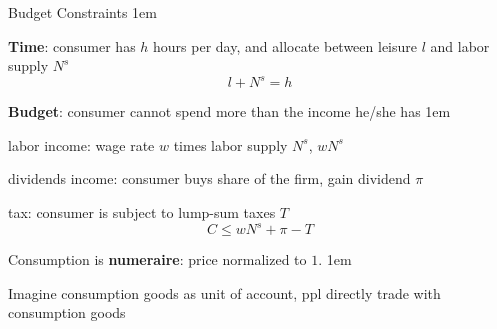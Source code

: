 \documentclass[11pt,aspectratio=43]{beamer}
\let\olditemize=\itemize
\let\endolditemize=\enditemize
\renewenvironment{itemize}{\olditemize \itemsep1em}{\endolditemize}
\theoremstyle{definition}
\begin{document}
\begin{frame}{Budget Constraints}
\label{slide:Budget_Constraints}
    \begin{itemize}
        \item \textbf{Time}: consumer has $ h $ hours per day, and allocate between leisure $ l $ and labor supply $ N^{s} $
        \begin{equation}
        \label{eq:LaborTime}
            l + N^{s} = h
        \end{equation}
        \item \textbf{Budget}: consumer cannot spend more than the income he/she has
        \begin{itemize}
            \item \alert{labor income}: wage rate $ w $ times labor supply $ N^{s} $, $ wN^{s} $
            \item \alert{dividends income}: consumer buys share of the firm, gain dividend $ \pi $
            \item \alert{tax}: consumer is subject to lump-sum taxes $ T $
        \end{itemize}
        \begin{equation}
        \label{eq:budgetConstraint}
            C \le w N^{s} + \pi - T
        \end{equation}
        \item Consumption is \textbf{numeraire}: price \alert{normalized} to $ 1 $.
        \begin{itemize}
            \item Imagine consumption goods as \alert{unit of account}, ppl directly trade with consumption goods
        \end{itemize}
    \end{itemize}
\end{frame}
\end{document}
